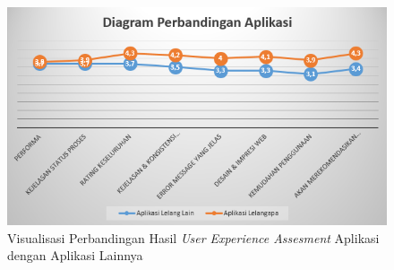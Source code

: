 \begin{figure}[b]
	\centering
	\includegraphics[width=.4\textwidth]{images/bab5/ujipengguna/chart.png}
	\caption{Visualisasi Perbandingan Hasil \textit{User Experience Assesment} Aplikasi dengan Aplikasi Lainnya}
	\label{ux-chart}
\end{figure}


